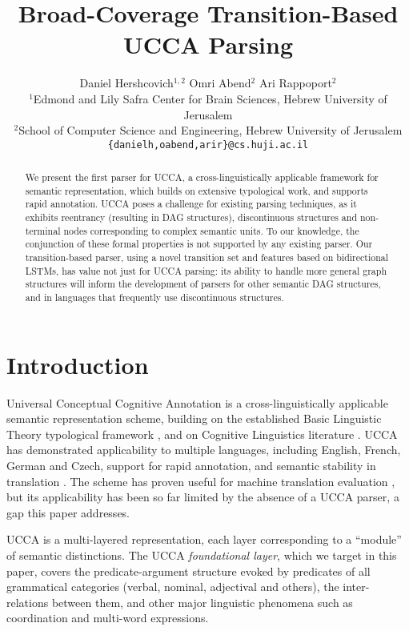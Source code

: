 \documentclass[11pt,a4paper]{article}
\title{Broad-Coverage Transition-Based UCCA Parsing}
\author{Daniel Hershcovich$^{1,2}$ \And Omri Abend$^2$ \And Ari Rappoport$^2$ \\
  $^1$Edmond and Lily Safra Center for Brain Sciences, Hebrew University of Jerusalem \\
  $^2$School of Computer Science and Engineering, Hebrew University of Jerusalem \\
  \texttt{\{danielh,oabend,arir\}@cs.huji.ac.il}
}
\date{}
\begin{document}
\maketitle

\begin{abstract}
  We present the first parser for UCCA, a
  cross-linguistically applicable framework for semantic
  representation, which builds on extensive
  typological work, and supports rapid annotation.
  UCCA poses a challenge for existing parsing techniques,
  as it exhibits reentrancy (resulting in DAG structures),
  discontinuous structures and non-terminal nodes corresponding
  to complex semantic units. To our knowledge, the conjunction
  of these formal properties is not supported by any existing parser.
  Our transition-based parser, using a novel transition set
  and features based on bidirectional LSTMs,
  has value not just for UCCA parsing:
  its ability to handle more general graph structures will inform
  the development of parsers for other semantic DAG structures, 
  and in languages that frequently use discontinuous structures.
\end{abstract}


\section{Introduction}\label{sec:introduction}

Universal Conceptual Cognitive Annotation \cite[UCCA,][]{abend2013universal}
is a cross-linguistically applicable semantic representation scheme,
building on the established Basic Linguistic Theory typological framework
\cite{Dixon:10b,Dixon:10a,Dixon:12}, and on Cognitive
Linguistics literature \cite{croft2004cognitive}.
UCCA has demonstrated applicability to multiple languages, including
English, French, German and Czech, support for rapid annotation,
and semantic stability in translation \cite{sulem2015conceptual}.
The scheme has proven useful for machine translation evaluation \cite{birch2016hume},
but its applicability has been so far limited by the absence of a UCCA parser,
a gap this paper addresses.

UCCA is a multi-layered representation, each layer corresponding
to a ``module'' of semantic distinctions.
The UCCA \textit{foundational layer}, which we target in this paper, covers the predicate-argument
structure evoked by predicates of all grammatical categories
(verbal, nominal, adjectival and others), the inter-relations between them,
and other major linguistic phenomena such as coordination and multi-word expressions.
\end{document}
